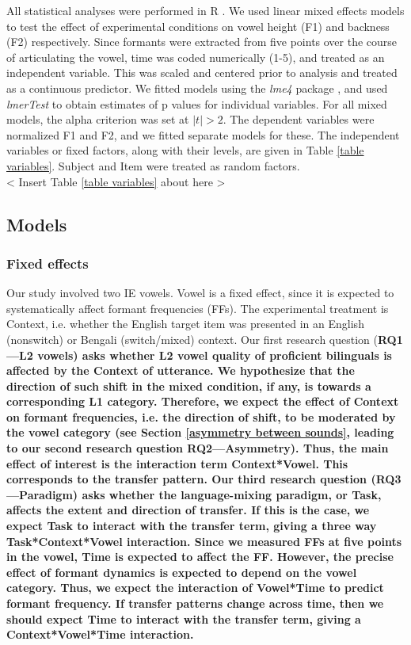 \documentclass[12 pt]{article}
\begin{document}
All statistical analyses were performed in R \citep{r}. We used linear mixed effects models to test the effect of experimental conditions on vowel height (F1) and backness (F2) respectively. Since formants were extracted from five points over the course of articulating the vowel, time was coded numerically (1-5), and treated as an independent variable. This was scaled and centered prior to analysis and treated as a continuous predictor. We fitted models using the \emph{lme4} package \citep{lme4}, and used \emph{lmerTest} \citep{lmerTest} to obtain estimates of p values for individual variables. For all mixed models, the alpha criterion was set at $|t| > 2 $. The dependent variables were normalized F1 and F2, and we fitted separate models for these. The independent variables or fixed factors, along with their levels, are given in Table \ref{table variables}. Subject and Item were treated as random factors.\\

< Insert Table \ref{table variables} about here > \\

\subsection{Models}

\subsubsection*{Fixed effects}

Our study involved two IE vowels. Vowel is a fixed effect, since it is expected to systematically affect formant frequencies (FFs). The experimental treatment is Context, i.e. whether the English target item was presented in an English (nonswitch) or Bengali (switch/mixed) context. Our first research question (\bf{RQ1---L2 vowels}) asks whether L2 vowel quality of proficient bilinguals is affected by the Context of utterance. We hypothesize that the direction of such shift in the mixed condition, if any, is towards a corresponding L1 category. Therefore, we expect the effect of Context on formant frequencies, i.e. the direction of shift, to be moderated by the vowel category (see Section \ref{asymmetry between sounds}, leading to our second research question \textbf{RQ2---Asymmetry}). Thus, the main effect of interest is the interaction term Context*Vowel. This corresponds to the transfer pattern. Our third research question (\bf{RQ3---Paradigm}) asks whether the language-mixing paradigm, or Task, affects the extent and direction of transfer. If this is the case, we expect Task to interact with the transfer term, giving a three way Task*Context*Vowel interaction. Since we measured FFs at five points in the vowel, Time is expected to affect the FF. However, the precise effect of formant dynamics is expected to depend on the vowel category. Thus, we expect the interaction of Vowel*Time to predict formant frequency. If transfer patterns change across time, then we should expect Time to interact with the transfer term, giving a Context*Vowel*Time interaction.
\end{document}
